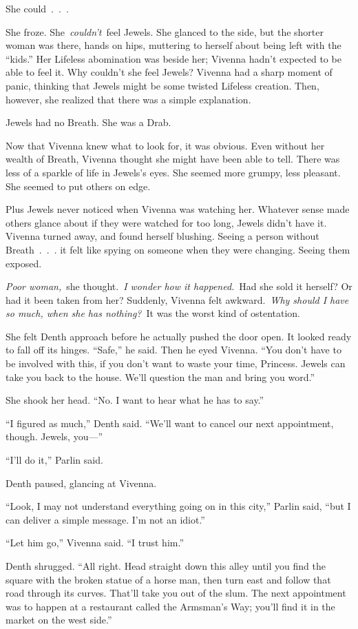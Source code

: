She could~.~.~.

She froze. She~\textit{couldn’t}~feel Jewels. She glanced to the side, but the shorter woman was there, hands on hips, muttering to herself about being left with the “kids.” Her Lifeless abomination was beside her; Vivenna hadn’t expected to be able to feel it. Why couldn’t she feel Jewels? Vivenna had a sharp moment of panic, thinking that Jewels might be some twisted Lifeless creation. Then, however, she realized that there was a simple explanation.

Jewels had no Breath. She was a Drab.

Now that Vivenna knew what to look for, it was obvious. Even without her wealth of Breath, Vivenna thought she might have been able to tell. There was less of a sparkle of life in Jewels’s eyes. She seemed more grumpy, less pleasant. She seemed to put others on edge.

Plus Jewels never noticed when Vivenna was watching her. Whatever sense made others glance about if they were watched for too long, Jewels didn’t have it. Vivenna turned away, and found herself blushing. Seeing a person without Breath~.~.~. it felt like spying on someone when they were changing. Seeing them exposed.

\textit{Poor woman,}~she thought.~\textit{I wonder how it happened.}~Had she sold it herself? Or had it been taken from her? Suddenly, Vivenna felt awkward.~\textit{Why should I have so much, when she has nothing?}~It was the worst kind of ostentation.

She felt Denth approach before he actually pushed the door open. It looked ready to fall off its hinges. “Safe,” he said. Then he eyed Vivenna. “You don’t have to be involved with this, if you don’t want to waste your time, Princess. Jewels can take you back to the house. We’ll question the man and bring you word.”

She shook her head. “No. I want to hear what he has to say.”

“I figured as much,” Denth said. “We’ll want to cancel our next appointment, though. Jewels, you—”

“I’ll do it,” Parlin said.

Denth paused, glancing at Vivenna.

“Look, I may not understand everything going on in this city,” Parlin said, “but I can deliver a simple message. I’m not an idiot.”

“Let him go,” Vivenna said. “I trust him.”

Denth shrugged. “All right. Head straight down this alley until you find the square with the broken statue of a horse man, then turn east and follow that road through its curves. That’ll take you out of the slum. The next appointment was to happen at a restaurant called the Armsman’s Way; you’ll find it in the market on the west side.”

